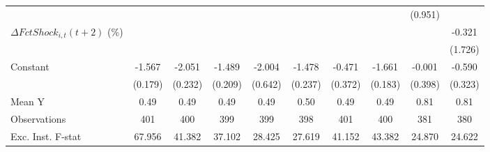 {\begin{tabular}{l*{9}{c}}
                    &                     &                     &                     &                     &                     &                     &                     &     (0.951)         &                     \\
\addlinespace
$ \Delta FctShock_{i,t}(t+2)$ (\%)&                     &                     &                     &                     &                     &                     &                     &                     &      -0.321         \\
                    &                     &                     &                     &                     &                     &                     &                     &                     &     (1.726)         \\
\addlinespace
Constant            &      -1.567\sym{***}&      -2.051\sym{***}&      -1.489\sym{***}&      -2.004\sym{***}&      -1.478\sym{***}&      -0.471         &      -1.661\sym{***}&      -0.001         &      -0.590\sym{*}  \\
                    &     (0.179)         &     (0.232)         &     (0.209)         &     (0.642)         &     (0.237)         &     (0.372)         &     (0.183)         &     (0.398)         &     (0.323)         \\
\midrule
Mean Y              &        0.49         &        0.49         &        0.49         &        0.49         &        0.50         &        0.49         &        0.49         &        0.81         &        0.81         \\
Observations        &         401         &         400         &         399         &         399         &         398         &         401         &         400         &         381         &         380         \\
Exc. Inst. F-stat   &      67.956         &      41.382         &      37.102         &      28.425         &      27.619         &      41.152         &      43.382         &      24.870         &      24.622         \\
\bottomrule
\end{tabular}
}
